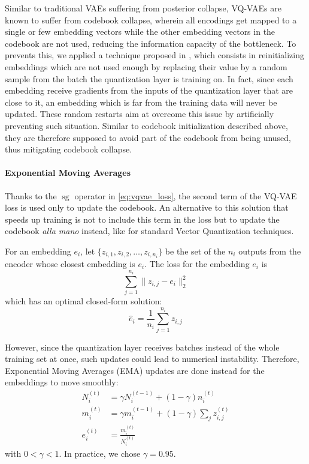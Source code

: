 \documentclass{article}
\DeclareMathOperator{\sg}{\text{sg}}
\begin{document}
Similar to traditional VAEs suffering from posterior collapse, VQ-VAEs are known to suffer from codebook collapse, wherein all encodings get mapped to a single or few embedding vectors while the other embedding vectors in the codebook are not used, reducing the information capacity of the bottleneck. To prevents this, we applied a technique proposed in \cite{Jukebox}, which consists in reinitializing embeddings which are not used enough by replacing their value by a random sample from the batch the quantization layer is training on. In fact, since each embedding receive gradients from the inputs of the quantization layer that are close to it, an embedding which is far from the training data will never be updated. These random restarts aim at overcome this issue by artificially preventing such situation. Similar to codebook initialization described above, they are therefore supposed to avoid part of the codebook from being unused, thus mitigating codebook collapse.

\paragraph*{Exponential Moving Averages}

Thanks to the $\sg$ operator in \autoref{eq:vqvae_loss}, the second term of the VQ-VAE loss is used only to update the codebook. An alternative to this solution that speeds up training is not to include this term in the loss but to update the codebook \emph{alla mano} instead, like for standard Vector Quantization techniques.

For an embedding $e_i$, let $\{z_{i,1}, z_{i,2}, \dots, z_{i,n_i}\}$ be the set of the $n_i$ outputs from the encoder whose closest embedding is $e_i$. The loss for the embedding $e_i$ is
\begin{equation}
    \sum_{j=1}^{n_i} \| z_{i,j} - e_i \|_2^2
\end{equation}
which has an optimal closed-form solution:
\begin{equation}
    \widehat{e}_i = \frac{1}{n_i} \sum_{j=1}^{n_i} z_{i,j}
\end{equation}

However, since the quantization layer receives batches instead of the whole training set at once, such updates could lead to numerical instability. Therefore, Exponential Moving Averages (EMA) updates are done instead for the embeddings to move smoothly:
\begin{equation}
    \begin{aligned}
       N_i^{(t)} &= \gamma N_i^{(t-1)} + (1 - \gamma) n_i^{(t)} \\
       m_i^{(t)} &= \gamma m_i^{(t-1)} + (1 - \gamma) \sum_j z_{i,j}^{(t)} \\
       e_i^{(t)} &= \frac{m_i^{(t)}}{N_i^{(t)}}
    \end{aligned}
\end{equation}
with $0 < \gamma < 1$. In practice, we chose $\gamma = 0.95$.
\end{document}
